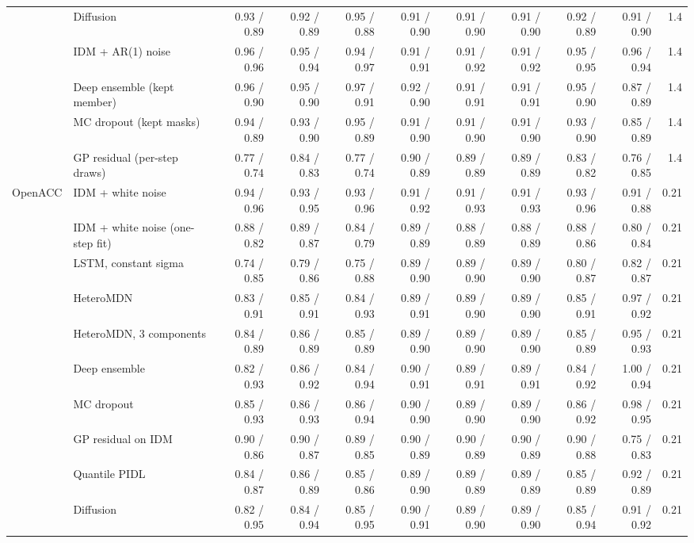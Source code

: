 \begin{longtable}{llrrrrrrrrr}
 & Diffusion & 0.93 / 0.89 & 0.92 / 0.89 & 0.95 / 0.88 & 0.91 / 0.90 & 0.91 / 0.90 & 0.91 / 0.90 & 0.92 / 0.89 & 0.91 / 0.90 & 1.4 \\
 & IDM + AR(1) noise & 0.96 / 0.96 & 0.95 / 0.94 & 0.94 / 0.97 & 0.91 / 0.91 & 0.91 / 0.92 & 0.91 / 0.92 & 0.95 / 0.95 & 0.96 / 0.94 & 1.4 \\
 & Deep ensemble (kept member) & 0.96 / 0.90 & 0.95 / 0.90 & 0.97 / 0.91 & 0.92 / 0.90 & 0.91 / 0.91 & 0.91 / 0.91 & 0.95 / 0.90 & 0.87 / 0.89 & 1.4 \\
 & MC dropout (kept masks) & 0.94 / 0.89 & 0.93 / 0.90 & 0.95 / 0.89 & 0.91 / 0.90 & 0.91 / 0.90 & 0.91 / 0.90 & 0.93 / 0.90 & 0.85 / 0.89 & 1.4 \\
 & GP residual (per-step draws) & 0.77 / 0.74 & 0.84 / 0.83 & 0.77 / 0.74 & 0.90 / 0.89 & 0.89 / 0.89 & 0.89 / 0.89 & 0.83 / 0.82 & 0.76 / 0.85 & 1.4 \\
\midrule
OpenACC & IDM + white noise & 0.94 / 0.96 & 0.93 / 0.95 & 0.93 / 0.96 & 0.91 / 0.92 & 0.91 / 0.93 & 0.91 / 0.93 & 0.93 / 0.96 & 0.91 / 0.88 & 0.21 \\
 & IDM + white noise (one-step fit) & 0.88 / 0.82 & 0.89 / 0.87 & 0.84 / 0.79 & 0.89 / 0.89 & 0.88 / 0.89 & 0.88 / 0.89 & 0.88 / 0.86 & 0.80 / 0.84 & 0.21 \\
 & LSTM, constant sigma & 0.74 / 0.85 & 0.79 / 0.86 & 0.75 / 0.88 & 0.89 / 0.90 & 0.89 / 0.90 & 0.89 / 0.90 & 0.80 / 0.87 & 0.82 / 0.87 & 0.21 \\
 & HeteroMDN & 0.83 / 0.91 & 0.85 / 0.91 & 0.84 / 0.93 & 0.89 / 0.91 & 0.89 / 0.90 & 0.89 / 0.90 & 0.85 / 0.91 & 0.97 / 0.92 & 0.21 \\
 & HeteroMDN, 3 components & 0.84 / 0.89 & 0.86 / 0.89 & 0.85 / 0.89 & 0.89 / 0.90 & 0.89 / 0.90 & 0.89 / 0.90 & 0.85 / 0.89 & 0.95 / 0.93 & 0.21 \\
 & Deep ensemble & 0.82 / 0.93 & 0.86 / 0.92 & 0.84 / 0.94 & 0.90 / 0.91 & 0.89 / 0.91 & 0.89 / 0.91 & 0.84 / 0.92 & 1.00 / 0.94 & 0.21 \\
 & MC dropout & 0.85 / 0.93 & 0.86 / 0.93 & 0.86 / 0.94 & 0.90 / 0.90 & 0.89 / 0.90 & 0.89 / 0.90 & 0.86 / 0.92 & 0.98 / 0.95 & 0.21 \\
 & GP residual on IDM & 0.90 / 0.86 & 0.90 / 0.87 & 0.89 / 0.85 & 0.90 / 0.89 & 0.90 / 0.89 & 0.90 / 0.89 & 0.90 / 0.88 & 0.75 / 0.83 & 0.21 \\
 & Quantile PIDL & 0.84 / 0.87 & 0.86 / 0.89 & 0.85 / 0.86 & 0.89 / 0.90 & 0.89 / 0.89 & 0.89 / 0.89 & 0.85 / 0.89 & 0.92 / 0.89 & 0.21 \\
 & Diffusion & 0.82 / 0.95 & 0.84 / 0.94 & 0.85 / 0.95 & 0.90 / 0.91 & 0.89 / 0.90 & 0.89 / 0.90 & 0.85 / 0.94 & 0.91 / 0.92 & 0.21 \\

\end{longtable}

